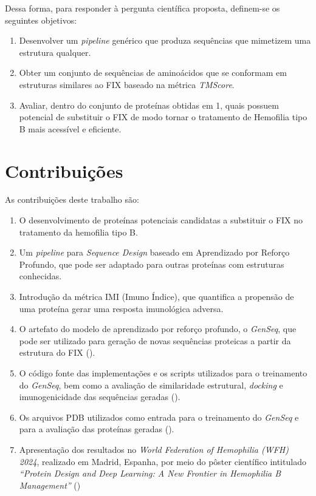 Dessa forma, para responder à pergunta científica proposta, definem-se os seguintes objetivos:

\begin{enumerate}
  \item Desenvolver um \textit{pipeline} genérico que produza sequências que mimetizem uma estrutura qualquer.
  \item Obter um conjunto de sequências de aminoácidos que se conformam em estruturas similares ao FIX baseado na métrica \textit{TMScore}.
  \item Avaliar, dentro do conjunto de proteínas obtidas em 1, quais possuem potencial de substituir o FIX de modo tornar o tratamento de Hemofilia tipo B mais acessível e eficiente.
\end{enumerate}

\section{Contribuições}
As contribuições deste trabalho são:
\begin{enumerate}
  \item O desenvolvimento de proteínas potenciais candidatas a substituir o FIX no tratamento da hemofilia tipo B.
  \item Um \textit{pipeline} para \textit{Sequence Design} baseado em Aprendizado por Reforço Profundo, que pode ser adaptado para outras proteínas com estruturas conhecidas.
  \item Introdução da métrica IMI (Imuno Índice), que quantifica a propensão de uma proteína gerar uma resposta imunológica adversa.
  \item O artefato do modelo de aprendizado por reforço profundo, o \textit{GenSeq}, que pode ser utilizado para geração de novas sequências proteicas a partir da estrutura do FIX (\cite{repo}).
  \item O código fonte das implementações e os scripts utilizados para o treinamento do \textit{GenSeq}, bem como a avaliação 
  de similaridade estrutural, \textit{docking} e imunogenicidade das sequências geradas (\cite{repo}).
  \item Os arquivos PDB utilizados como entrada para o treinamento do \textit{GenSeq} e para a avaliação das proteínas geradas (\cite{repo}).
  \item Apresentação dos resultados no \textit{World Federation of Hemophilia (WFH) 2024}, realizado em Madrid, Espanha, por meio do pôster científico intitulado \textit{“Protein Design and Deep Learning: A New Frontier in Hemophilia B Management”} (\cite{WFH2024})
\end{enumerate}